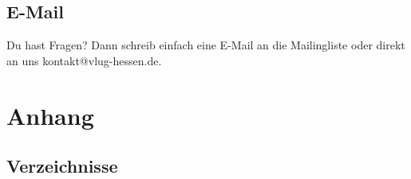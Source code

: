 \documentclass[a4paper,10pt,ngerman,titlepage,twoside]{scrreprt}
\begin{document}
\section{E-Mail}
Du hast Fragen? Dann schreib einfach eine E-Mail an die Mailingliste oder direkt an uns kontakt@vlug-hessen.de.
\appendix
\chapter{Anhang}
\section{Verzeichnisse}
\listoffigures
\lstlistoflistings
\listoftables
\printglossaries
\printindex

\end{document}
